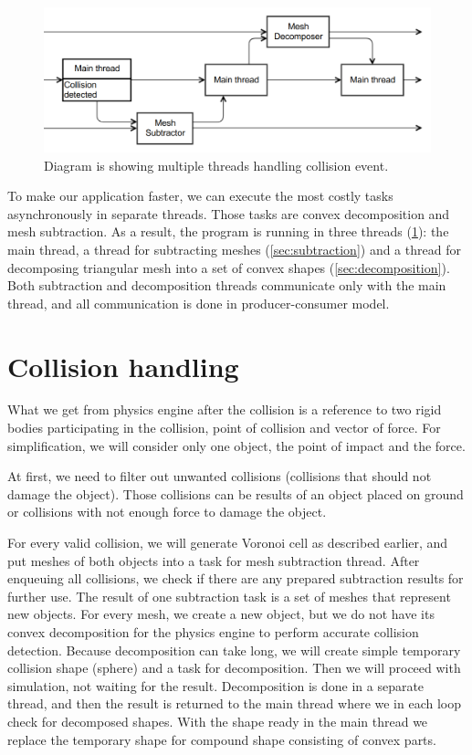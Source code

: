 \begin{figure}
        \centering
        \includegraphics[width=\textwidth]{img/decompositionFlow}
        \caption{Diagram is showing multiple threads handling collision event. }
        \label{fig:threads}
\end{figure}
To make our application faster, we can execute the most costly tasks asynchronously in separate threads. Those tasks are convex decomposition and mesh subtraction. As a result, the program is running in three threads (\cref{fig:threads}): the main thread, a thread for subtracting meshes (\cref{sec:subtraction}) and a thread for decomposing triangular mesh into a set of convex shapes (\cref{sec:decomposition}). Both subtraction and decomposition threads communicate only with the main thread, and all communication is done in producer-consumer model.


\section{Collision handling}
\label{sec:collisions}
What we get from physics engine after the collision is a reference to two rigid bodies participating in the collision, point of collision and vector of force. For simplification, we will consider only one object, the point of impact and the force.

At first, we need to filter out unwanted collisions (collisions that should not damage the object). Those collisions can be results of an object placed on ground or collisions with not enough force to damage the object. 

For every valid collision, we will generate Voronoi cell as described earlier, and put meshes of both objects into a task for mesh subtraction thread. After enqueuing all collisions, we check if there are any prepared subtraction results for further use. The result of one subtraction task is a set of meshes that represent new objects. For every mesh, we create a new object, but we do not have its convex decomposition for the physics engine to perform accurate collision detection. Because decomposition can take long, we will create simple temporary collision shape (\eg sphere) and a task for decomposition. Then we will proceed with simulation, not waiting for the result. Decomposition is done in a separate thread, and then the result is returned to the main thread where we in each loop check for decomposed shapes. With the shape ready in the main thread we replace the temporary shape for compound shape consisting of convex parts.

